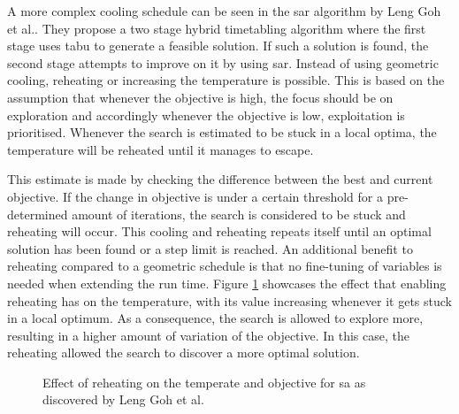 A more complex cooling schedule can be seen in the \acrfull{sar} algorithm by Leng Goh et al.\cite{Goh2017}. They propose a two stage hybrid timetabling algorithm where the first stage uses \acrlong{tabu} to generate a feasible solution. If such a solution is found, the second stage attempts to improve on it by using \acrshort{sar}. Instead of using geometric cooling, reheating or increasing the temperature is possible. This is based on the assumption that whenever the objective is high, the focus should be on exploration and accordingly whenever the objective is low, exploitation is prioritised. Whenever the search is estimated to be stuck in a local optima, the temperature will be reheated until it manages to escape. 

This estimate is made by checking the difference between the best and current objective. If the change in objective is under a certain threshold for a pre-determined amount of iterations, the search is considered to be stuck and reheating will occur. This cooling and reheating repeats itself until an optimal solution has been found or a step limit is reached. An additional benefit to reheating compared to a geometric schedule is that no fine-tuning of variables is needed when extending the run time. Figure \ref{fig:SAR} showcases the effect that enabling reheating has on the temperature, with its value increasing whenever it gets stuck in a local optimum. As a consequence, the search is allowed to explore more, resulting in a higher amount of variation of the objective. In this case, the reheating allowed the search to discover a more optimal solution.

\begin{figure}[H]
  \centering
  \hfill
  \caption{Effect of reheating on the temperate and objective for \acrlong{sa} as discovered by Leng Goh et al.\cite{Goh2017}}
  \label{fig:SAR}
\end{figure}





